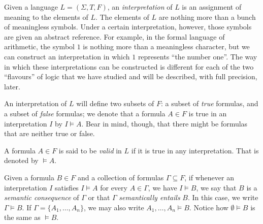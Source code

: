 \begin{definition}
Given a language $L = (\Sigma,T,F)$, an \emph{interpretation} of $L$ is an assignment of meaning to the elements of $L$. The elements of $L$ are nothing more than a bunch of meaningless symbols.
Under a certain interpretation, however, those symbols are given an abstract reference.
For example, in the formal language of arithmetic, the symbol $1$ is nothing more than a meaningless character, but we can construct an interpretation in which $1$ represents ``the number one''.
The way in which these interpretations can be constructed is different for each of the two ``flavours'' of logic that we have studied and will be described, with full precision, later.

An interpretation of $L$ will define two subsets of $F$: a subset of \emph{true} formulas, and a subset of \emph{false} formulas; we denote that a formula $A\in F$ is true in an interpretation $I$ by $I\vDash A$. Bear in mind, though, that there might be formulas that are neither true or false.

A formula $A\in F$ is said to be \emph{valid} in $L$ if it is true in any interpretation. That is denoted by $\vDash A$.

Given a formula $B\in F$ and a collection of formulas $\Gamma\subseteq F$, if whenever an interpretation $I$ satisfies $I\vDash A$ for every $A\in \Gamma$, we have $I\vDash B$, we say that $B$ is a \emph{semantic consequence} of $\Gamma$ or that $\Gamma$ \emph{semantically entails} $B$.
In this case, we write $\Gamma\vDash B$.
If $\Gamma = \{A_1,\ldots,A_n\}$, we may also write $A_1,\ldots,A_n\vDash B$.
Notice how $\emptyset \vDash B$ is the same as $\vDash B$.
\end{definition}



